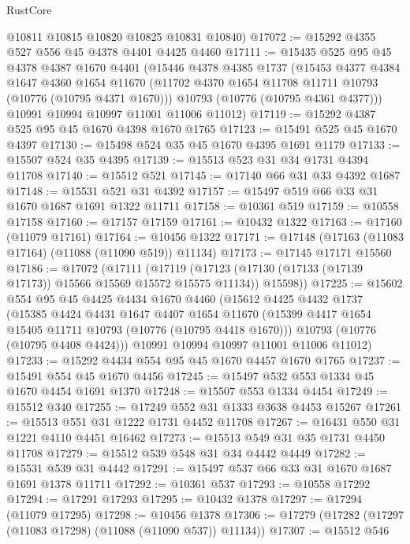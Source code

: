 \begin{lexlean}{RustCore}
\begin{coremodule}
      @10811
      @10815
      @10820
      @10825
      @10831
      @10840)
@17072 := @15292 @4355 @527 @556 @45 @4378 @4401 @4425 @4460
@17111 := @15435
    @525
    @95
    @45
    @4378
    @4387
    @1670
    @4401
    (@15446
      @4378
      @4385
      @1737
      (@15453
        @4377
        @4384
        @1647
        @4360
        @1654
        @11670
        (@11702 @4370 @1654 @11708 @11711 @10793 (@10776 (@10795 @4371 @1670)))
        @10793
        (@10776 (@10795 @4361 @4377)))
      @10991
      @10994
      @10997
      @11001
      @11006
      @11012)
@17119 := @15292 @4387 @525 @95 @45 @1670 @4398 @1670 @1765
@17123 := @15491 @525 @45 @1670 @4397
@17130 := @15498 @524 @35 @45 @1670 @4395 @1691 @1179
@17133 := @15507 @524 @35 @4395
@17139 := @15513 @523 @31 @34 @1731 @4394 @11708
@17140 := @15512 @521
@17145 := @17140 @66 @31 @33 @4392 @1687
@17148 := @15531 @521 @31 @4392
@17157 := @15497 @519 @66 @33 @31 @1670 @1687 @1691 @1322 @11711
@17158 := @10361 @519
@17159 := @10558 @17158
@17160 := @17157 @17159
@17161 := @10432 @1322
@17163 := @17160 (@11079 @17161)
@17164 := @10456 @1322
@17171 := @17148 (@17163 (@11083 @17164) (@11088 (@11090 @519)) @11134)
@17173 := @17145 @17171 @15560
@17186 := @17072
    (@17111
      (@17119 (@17123 (@17130 (@17133 (@17139 @17173)) @15566 @15569 @15572 @15575 @11134)) @15598))
@17225 := @15602
    @554
    @95
    @45
    @4425
    @4434
    @1670
    @4460
    (@15612
      @4425
      @4432
      @1737
      (@15385
        @4424
        @4431
        @1647
        @4407
        @1654
        @11670
        (@15399 @4417 @1654 @15405 @11711 @10793 (@10776 (@10795 @4418 @1670)))
        @10793
        (@10776 (@10795 @4408 @4424)))
      @10991
      @10994
      @10997
      @11001
      @11006
      @11012)
@17233 := @15292 @4434 @554 @95 @45 @1670 @4457 @1670 @1765
@17237 := @15491 @554 @45 @1670 @4456
@17245 := @15497 @532 @553 @1334 @45 @1670 @4454 @1691 @1370
@17248 := @15507 @553 @1334 @4454
@17249 := @15512 @340
@17255 := @17249 @552 @31 @1333 @3638 @4453 @15267
@17261 := @15513 @551 @31 @1222 @1731 @4452 @11708
@17267 := @16431 @550 @31 @1221 @4110 @4451 @16462
@17273 := @15513 @549 @31 @35 @1731 @4450 @11708
@17279 := @15512 @539 @548 @31 @34 @4442 @4449
@17282 := @15531 @539 @31 @4442
@17291 := @15497 @537 @66 @33 @31 @1670 @1687 @1691 @1378 @11711
@17292 := @10361 @537
@17293 := @10558 @17292
@17294 := @17291 @17293
@17295 := @10432 @1378
@17297 := @17294 (@11079 @17295)
@17298 := @10456 @1378
@17306 := @17279 (@17282 (@17297 (@11083 @17298) (@11088 (@11090 @537)) @11134))
@17307 := @15512 @546

\end{coremodule}
\end{lexlean}
